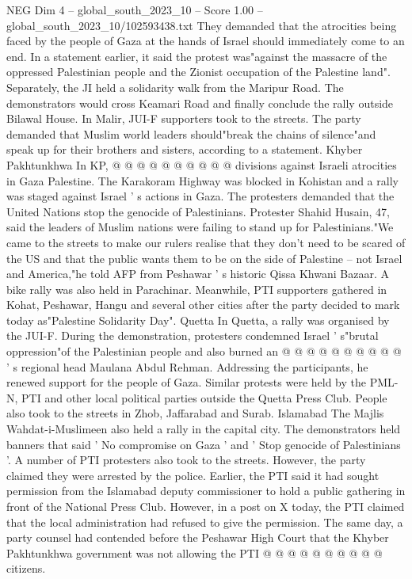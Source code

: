\begin{textsample}{NEG Dim 4 – global\_south\_2023\_10 – Score 1.00 – global\_south\_2023\_10/102593438.txt}
They demanded that the atrocities being faced by the people of Gaza at the hands of Israel should immediately come to an end.
In a statement earlier, it said the protest was"against the massacre of the oppressed Palestinian people and the Zionist occupation of the Palestine land".
Separately, the JI held a solidarity walk from the Maripur Road.
The demonstrators would cross Keamari Road and finally conclude the rally outside Bilawal House.
In Malir, JUI-F supporters took to the streets.
The party demanded that Muslim world leaders should"break the chains of silence"and speak up for their brothers and sisters, according to a statement.
Khyber Pakhtunkhwa In KP, @ @ @ @ @ @ @ @ @ @ divisions against Israeli atrocities in Gaza Palestine.
The Karakoram Highway was blocked in Kohistan and a rally was staged against Israel ' s actions in Gaza.
The protesters demanded that the United Nations stop the genocide of Palestinians.
Protester Shahid Husain, 47, said the leaders of Muslim nations were failing to stand up for Palestinians."We came to the streets to make our rulers realise that they don't need to be scared of the US and that the public wants them to be on the side of Palestine -- not Israel and America,"he told AFP from Peshawar ' s historic Qissa Khwani Bazaar.
A bike rally was also held in Parachinar.
Meanwhile, PTI supporters gathered in Kohat, Peshawar, Hangu and several other cities after the party decided to mark today as"Palestine Solidarity Day".
Quetta In Quetta, a rally was organised by the JUI-F.
During the demonstration, protesters condemned Israel ' s"brutal oppression"of the Palestinian people and also burned an @ @ @ @ @ @ @ @ @ @ ' s regional head Maulana Abdul Rehman.
Addressing the participants, he renewed support for the people of Gaza.
Similar protests were held by the PML-N, PTI and other local political parties outside the Quetta Press Club.
People also took to the streets in Zhob, Jaffarabad and Surab.
Islamabad The Majlis Wahdat-i-Muslimeen also held a rally in the capital city.
The demonstrators held banners that said ' No compromise on Gaza ' and ' Stop genocide of Palestinians '.
A number of PTI protesters also took to the streets.
However, the party claimed they were arrested by the police.
Earlier, the PTI said it had sought permission from the Islamabad deputy commissioner to hold a public gathering in front of the National Press Club.
However, in a post on X today, the PTI claimed that the local administration had refused to give the permission.
The same day, a party counsel had contended before the Peshawar High Court that the Khyber Pakhtunkhwa government was not allowing the PTI @ @ @ @ @ @ @ @ @ @ citizens.

\end{textsample}
